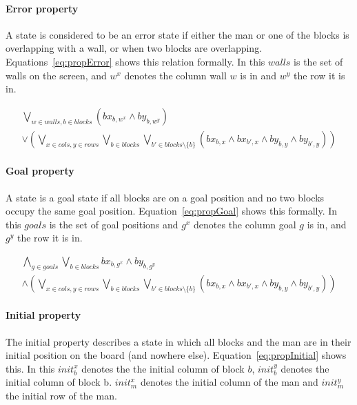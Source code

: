 \paragraph{Error property} A state is considered to be an error state if either
the man or one of the blocks is overlapping with a wall, or when two blocks are
overlapping. Equations~\ref{eq:propError} shows this relation formally. In this
$walls$ is the set of walls on the screen, and $w^x$ denotes the column
wall $w$ is in and $w^y$ the row it is in.

\begin{multline}\label{eq:propError}
	\bigvee_{w \in walls, b \in blocks} (bx_{b,w^x} \wedge by_{b,w^y})\\  
	\vee \left( \bigvee_{x \in cols, y \in rows} \bigvee_{b \in blocks}
				\bigvee_{b' \in blocks \setminus \{b\}} 
					(bx_{b,x} \wedge bx_{b',x} \wedge by_{b,y} \wedge by_{b',y})
		\right)
\end{multline}

\paragraph{Goal property} A state is a goal state if all blocks are on a goal
position and no two blocks occupy the same goal position. 
Equation~\ref{eq:propGoal} shows this formally. In this $goals$ is the set of
goal positions and $g^x$ denotes the column goal $g$ is in, and $g^y$ the row
it is in.

\begin{multline}\label{eq:propGoal}
	\bigwedge_{g \in goals} \bigvee_{b \in blocks} 
		bx_{b,g^x} \wedge by_{b,g^y}\\  
	\wedge \left( \bigvee_{x \in cols, y \in rows} \bigvee_{b \in blocks}
				\bigvee_{b' \in blocks \setminus \{b\}} 
					(bx_{b,x} \wedge bx_{b',x} \wedge by_{b,y} \wedge by_{b',y})
		\right)
\end{multline}

\paragraph{Initial property} The initial property describes a state in which all
blocks and the man are in their initial position on the board (and nowhere 
else). Equation~\ref{eq:propInitial} shows this. In this $init_b^x$ denotes
the the initial column of block $b$, $init_b^y$ denotes the initial column of
block b. $init_m^x$ denotes the initial column of the man and $init_m^y$ the 
initial row of the man.

